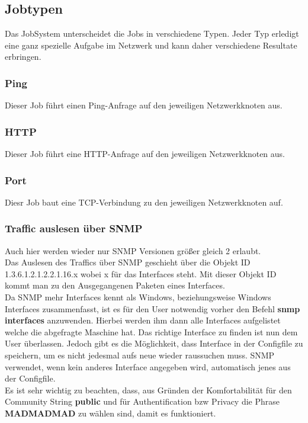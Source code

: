 \documentclass[12pt,a4paper]{report}
\begin{document}
\subsection{Jobtypen}

Das JobSystem unterscheidet die Jobs in verschiedene Typen. Jeder Typ erledigt eine ganz spezielle Aufgabe im Netzwerk und kann daher verschiedene Resultate erbringen.

\subsubsection{Ping} Dieser Job führt einen Ping-Anfrage auf den jeweiligen Netzwerkknoten aus.

\subsubsection{HTTP} Dieser Job führt eine HTTP-Anfrage auf den jeweiligen Netzwerkknoten aus.

\subsubsection{Port} Diesr Job baut eine TCP-Verbindung zu den jeweiligen Netzwerkknoten auf.

\newpage
{}%

\subsubsection{Traffic auslesen über SNMP}
Auch hier werden wieder nur SNMP Versionen größer gleich 2 erlaubt.\\
Das Auslesen des Traffics über SNMP geschieht über die Objekt ID 1.3.6.1.2.1.2.2.1.16.x wobei x für das Interfaces steht. Mit dieser Objekt ID kommt man zu den Ausgegangenen Paketen eines Interfaces.\\
Da SNMP mehr Interfaces kennt als Windows, beziehungsweise Windows Interfaces zusammenfasst, ist es für den User notwendig vorher den Befehl \textbf{snmp interfaces} anzuwenden. Hierbei werden ihm dann alle Interfaces aufgelistet welche die abgefragte Maschine hat. Das richtige Interface zu finden ist nun dem User überlassen. Jedoch gibt es die Möglichkeit, dass Interface in der Configfile zu speichern, um es nicht jedesmal aufs neue wieder raussuchen muss. SNMP verwendet, wenn kein anderes Interface angegeben wird, automatisch jenes aus der Configfile.\\
Es ist sehr wichtig zu beachten, dass, aus Gründen der Komfortabilität für den Community String \textbf{public} und für Authentification bzw Privacy die Phrase \textbf{MADMADMAD} zu wählen sind, damit es funktioniert.\\
\end{document}
